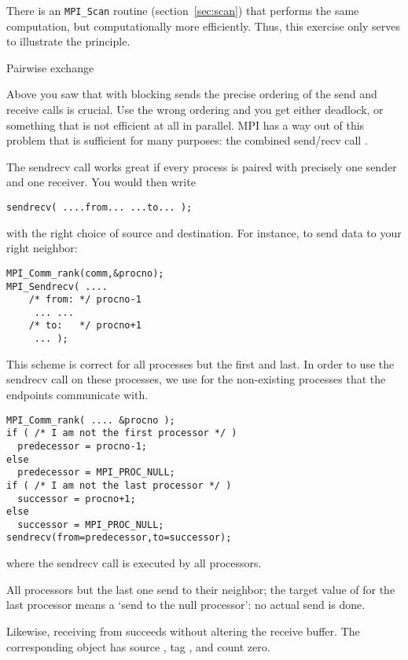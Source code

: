 \begin{remark}
  There is an \lstinline{MPI_Scan} routine (section~\ref{sec:scan})
  that performs the same computation,
  but computationally more efficiently. Thus, this exercise only serves to illustrate
  the principle.
\end{remark}


 {Pairwise exchange}
\label{sec:send-recv}

Above you saw that with blocking sends the precise ordering of the
send and receive calls is crucial. Use the wrong ordering and you get
either deadlock, or something that is not efficient at all in
parallel. MPI has a way out of this problem that is sufficient for
many purposes: the combined send/recv call .

The sendrecv call works great if every process is paired
with precisely one sender and one receiver.
You would then write
\begin{lstlisting}
sendrecv( ....from... ...to... );
\end{lstlisting}
with the right choice of source and destination. For instance, to send
data to your right neighbor:
\begin{lstlisting}
MPI_Comm_rank(comm,&procno);
MPI_Sendrecv( .... 
    /* from: */ procno-1
     ... ... 
    /* to:   */ procno+1
     ... );
\end{lstlisting}
This scheme is correct for all processes but the first and last. 
In order to use the sendrecv call on these processes,
we use  for the non-existing
processes that the endpoints communicate with.
\begin{lstlisting}
MPI_Comm_rank( .... &procno );
if ( /* I am not the first processor */ )
  predecessor = procno-1;
else
  predecessor = MPI_PROC_NULL;
if ( /* I am not the last processor */ )
  successor = procno+1;
else
  successor = MPI_PROC_NULL;
sendrecv(from=predecessor,to=successor);
\end{lstlisting}
where the sendrecv call is executed by all processors.

All processors but the last one send to their neighbor; the target
value of  for
the last processor means a `send to the null processor': no actual
send is done. 

Likewise, receiving from  succeeds without
altering the receive buffer.  The corresponding
 object has source
, tag , and
count zero.

